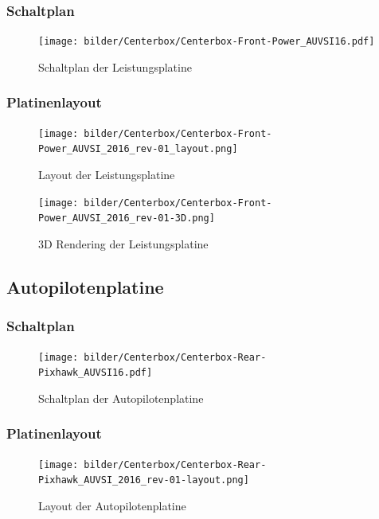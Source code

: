 \subsubsection{Schaltplan}

\newpage

\begin{figure}[H]
\centering
\texttt{[image: bilder/Centerbox/Centerbox-Front-Power\_AUVSI16.pdf]} 
\caption{Schaltplan der Leistungsplatine} 
\label{fig:Schaltplan der Leistungsplatine}
\end{figure}

\subsubsection{Platinenlayout}

\begin{figure}[H]
\centering
\texttt{[image: bilder/Centerbox/Centerbox-Front-Power\_AUVSI\_2016\_rev-01\_layout.png]} 
\caption{Layout der Leistungsplatine} 
\label{fig:Layout der Leistungsplatine}
\end{figure}

\begin{figure}[H]
\centering
\texttt{[image: bilder/Centerbox/Centerbox-Front-Power\_AUVSI\_2016\_rev-01-3D.png]} 
\caption{3D Rendering der Leistungsplatine} 
\label{fig:3D Rendering der Leistungsplatine}
\end{figure}

\subsection{Autopilotenplatine}

\subsubsection{Schaltplan}

\newpage

\begin{figure}[H]
\centering
\texttt{[image: bilder/Centerbox/Centerbox-Rear-Pixhawk\_AUVSI16.pdf]} 
\caption{Schaltplan der Autopilotenplatine} 
\label{fig:Schaltplan der Autopilotenplatine}
\end{figure}

\subsubsection{Platinenlayout}

\begin{figure}[H]
\centering
\texttt{[image: bilder/Centerbox/Centerbox-Rear-Pixhawk\_AUVSI\_2016\_rev-01-layout.png]} 
\caption{Layout der Autopilotenplatine} 
\label{fig:Layout der Autopilotenplatine}
\end{figure}


